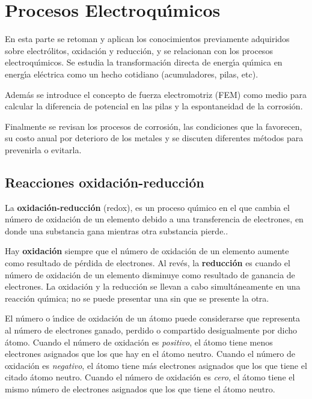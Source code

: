 \section[Procesos electroquimicos]{Procesos Electroqu\'{\i}micos}
En esta parte se retoman y aplican los conocimientos previamente adquiridos sobre  electr\'olitos, oxidaci\'on y reducci\'on, y  se relacionan con los procesos electroqu\'{\i}micos.  Se  estudia la transformaci\'on directa de energ\'{\i}a qu\'{\i}mica en energ\'{\i}a
el\'ectrica como un hecho cotidiano (acumuladores, pilas, etc).

Adem\'as se introduce el concepto de fuerza electromotriz (FEM) como medio para calcular la diferencia de potencial en las pilas y la espontaneidad de la corrosi\'on.

Finalmente se revisan los procesos de corrosi\'on, las condiciones que la favorecen, su
costo anual por deterioro de los metales y se discuten diferentes m\'etodos para prevenirla
o evitarla.
\subsection{Reacciones oxidaci\'on-reducci\'on}
La \textbf{oxidaci\'on-reducci\'on} (redox), es un proceso  qu\'{\i}mico en el que cambia el n\'umero de oxidaci\'on de un elemento debido a una transferencia de electrones, en donde una substancia gana mientras otra substancia pierde..

Hay \textbf{oxidaci\'on} siempre que el n\'umero de  oxidaci\'on de un elemento aumente como resultado de p\'erdida de electrones. Al rev\'es, la \textbf{reducci\'on}  es cuando el n\'umero de oxidaci\'on de un elemento disminuye como resultado de ganancia de electrones. La oxidaci\'on y la reducci\'on se llevan a cabo simult\'aneamente en una reacci\'on qu\'{\i}mica; no se puede presentar una sin que se presente la otra.

El n\'umero o \'{\i}ndice de oxidaci\'on de un \'atomo puede considerarse que representa al n\'umero de electrones ganado, perdido o compartido desigualmente por dicho \'atomo. Cuando el n\'umero de oxidaci\'on es \textit{positivo}, el \'atomo tiene menos electrones asignados que los que hay en el \'atomo neutro. Cuando el n\'umero de oxidaci\'on es \textit{negativo}, el \'atomo tiene m\'as electrones asignados que los que tiene el citado \'atomo neutro. Cuando el n\'umero de oxidaci\'on  es \textit{cero}, el \'atomo tiene el mismo n\'umero de electrones asignados que los que tiene el \'atomo neutro.

